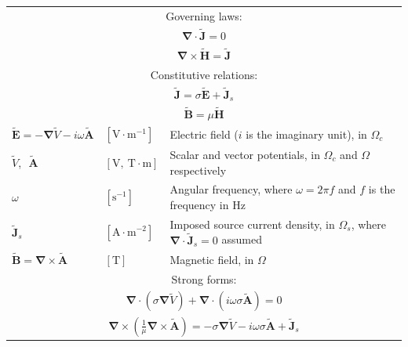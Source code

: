 \documentclass[letterpaper]{article}
\newcommand{\vect}[1]{\mathbf#1}
\newcommand{\vecp}[1]{\tilde{\mathbf#1}}
\newcommand{\nab}{\vect{\nabla}}
\begin{document}
\begin{table}[h!]
\centering
\begin{tabular}{lll}
\hline
\multicolumn{3}{c}{Governing laws:} \\
\multicolumn{3}{c}{$\nab\cdot\vecp{J}=0$}\\%
\multicolumn{3}{c}{$\nab\times\vecp{H}=\vecp{J}$}\\
\hline

\multicolumn{3}{c}{Constitutive relations:} \\
\multicolumn{3}{c}{$\vecp{J}=\sigma\vecp{E}+\vecp{J}_s$}\\%
\multicolumn{3}{c}{$\vecp{B}=\mu\vecp{H}$}\\
$\vecp{E}=-\nab \tilde{V}-i\omega\vecp{A}$ & $[\text{V}\cdot \text{m}^{-1}]$ & Electric field ($i$ is the imaginary unit), in $\Omega_c$\\
$\tilde{V}$,~$\,\vecp{A}$ & $[\text{V},~\text{T}\cdot \text{m}]$ & Scalar and vector potentials, in $\Omega_c$ and $\Omega$ respectively\\
$\omega$ & $[\text{s}^{-1}]$ & Angular frequency, where $\omega=2\pi f$ and $f$ is the frequency in Hz\\
$\vecp{J}_s$ & $[\text{A}\cdot \text{m}^{-2}]$ & Imposed source current density, in $\Omega_s$, where $\nab\cdot\vecp{J}_s=0$ assumed\\
$\vecp{B}=\nab \times\vecp{A}$ & $[\text{T}]$ & Magnetic field, in $\Omega$\\
\hline

\multicolumn{3}{c}{Strong forms:} \\[1pt]
\multicolumn{3}{c}{$\nab\cdot\left(\sigma\nab \tilde{V}\right)+\nab\cdot\left(i\omega\sigma\vecp{A}\right)=0$}\\
\multicolumn{3}{c}{$\displaystyle\nab\times\left(\frac{1}{\mu}\nab\times \vecp{A}\right)=-\sigma\nab \tilde{V}-i\omega\sigma\vecp{A}+\vecp{J}_s$}\\[7pt]
\hline


\end{tabular}
\end{table}
\end{document}
